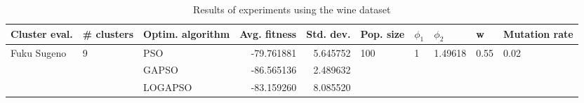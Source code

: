 \begin{table}
\centering
\caption{Results of experiments using the wine dataset}
\begin{tabular}{lllrrlllll}
\toprule
               Cluster eval. &        \# clusters & Optim. algorithm &  Avg. fitness &  Std. dev. &            Pop. size &         $\phi_{1}$ &               $\phi_{2}$ &                     w &         Mutation rate \\
\midrule
\multirow{3}{*}{Fuku Sugeno} & \multirow{3}{*}{9} &              PSO &    -79.761881 &   5.645752 & \multirow{3}{*}{100} & \multirow{3}{*}{1} & \multirow{3}{*}{1.49618} & \multirow{3}{*}{0.55} & \multirow{3}{*}{0.02} \\
                             &                    &            GAPSO &    -86.565136 &   2.489632 &                      &                    &                          &                       &                       \\
                             &                    &          LOGAPSO &    -83.159260 &   8.085520 &                      &                    &                          &                       &                       \\
\bottomrule
\end{tabular}
\end{table}
